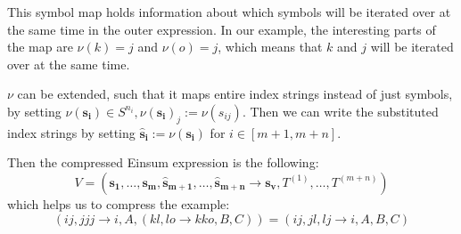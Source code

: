 \begin{theorem}
    This symbol map holds information about which symbols will be iterated over at the same time in the outer expression.
    In our example, the interesting parts of the map are $\nu(k) = j$ and $\nu(o) = j$, which means that $k$ and $j$ will be iterated over at the same time.

    $\nu$ can be extended, such that it maps entire index strings instead of just symbols, by setting $\nu(\bm{s_i}) \in S^{n_i}, \nu(\bm{s_i})_j := \nu(s_{ij})$.
    Then we can write the substituted index strings by setting $\bm{\hat{s}_i} := \nu(\bm{s_i})$ for $i \in [m + 1, m + n]$.

    Then the compressed Einsum expression is the following:
    $$V = (\bm{s_1},\dots,\bm{s_m}, \bm{\hat{s}_{m + 1}}, \dots, \bm{\hat{s}_{m + n}} \rightarrow \bm{s_v}, T^{(1)},\dots,T^{(m + n)})$$
    which helps us to compress the example:
    $$(ij, jjj \rightarrow i, A, (kl, lo \rightarrow kko, B, C)) = (ij, jl, lj \rightarrow i, A, B, C)$$
\end{theorem}

